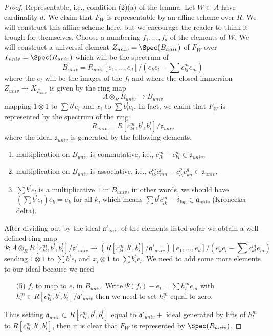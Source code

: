 \begin{proof}
\medskip\noindent
Representable, i.e., condition (2)(a) of the lemma. Let $W \subset A$
have cardinality $d$. We claim that $F_W$ is representable by an affine
scheme over $R$. We will construct this affine scheme here, but we encourage
the reader to think it trough for themselves. Choose a numbering
$f_1, \ldots, f_d$ of the elements of $W$. We will construct a universal
element $Z_{univ} = \Spec(B_{univ})$ of $F_W$ over $T_{univ} = \Spec(R_{univ})$
which will be the spectrum of
$$
B_{univ} = R_{univ}[e_1, \ldots, e_d]/
(e_ke_l - \sum c_{kl}^m e_m)
$$
where the $e_l$ will be the images of the $f_l$
and where the closed immersion $Z_{univ} \to X_{T_{univ}}$ is given
by the ring map
$$
A \otimes_R R_{univ} \longrightarrow B_{univ}
$$
mapping $1 \otimes 1$ to $\sum b^le_l$ and $x_i$ to $\sum b_i^le_l$.
In fact, we claim that $F_W$ is represented by the spectrum of the ring
$$
R_{univ} = R[c_{kl}^m, b^l, b_i^l]/\mathfrak a_{univ}
$$
where the ideal $\mathfrak a_{univ}$ is generated by the
following elements:
\begin{enumerate}
\item multiplication on $B_{univ}$ is commutative, i.e.,
$c_{lk}^m - c_{kl}^m \in \mathfrak a_{univ}$,
\item multiplication on $B_{univ}$ is associative, i.e.,
$c_{lk}^m c_{m n}^p - c_{lq}^p c_{kn}^q \in \mathfrak a_{univ}$,
\item $\sum b^le_l$ is a multiplicative $1$ in $B_{univ}$,
in other words, we should have $(\sum b^le_l)e_k = e_k$ for all $k$,
which means $\sum b^lc_{lk}^m - \delta_{km} \in \mathfrak a_{univ}$
(Kronecker delta).
\end{enumerate}
After dividing out by the ideal $\mathfrak a'_{univ}$ of the elements
listed sofar we obtain a well defined ring map
$$
\Psi :
A \otimes_R R[c_{kl}^m, b^l, b_i^l]/\mathfrak a'_{univ}
\longrightarrow
\left(R[c_{kl}^m, b^l, b_i^l]/\mathfrak a'_{univ}\right)
[e_1, \ldots, e_d]/(e_ke_l - \sum c_{kl}^m e_m)
$$
sending $1 \otimes 1$ to $\sum b^le_l$ and $x_i \otimes 1$ to $\sum b_i^le_l$.
We need to add some more elements to our ideal because we need
\begin{enumerate}
\item[(5)] $f_l$ to map to $e_l$ in $B_{univ}$. Write
$\Psi(f_l) - e_l = \sum h_l^me_m$ with
$h_l^m \in R[c_{kl}^m, b^l, b_i^l]/\mathfrak a'_{univ}$
then we need to set $h_l^m$ equal to zero.
\end{enumerate}
Thus setting $\mathfrak a_{univ} \subset R[c_{kl}^m, b^l, b_i^l]$
equal to $\mathfrak a'_{univ} + $ ideal generated by
lifts of $h_l^m$ to $R[c_{kl}^m, b^l, b_i^l]$, then
it is clear that $F_W$ is represented by $\Spec(R_{univ})$.
\end{proof}

